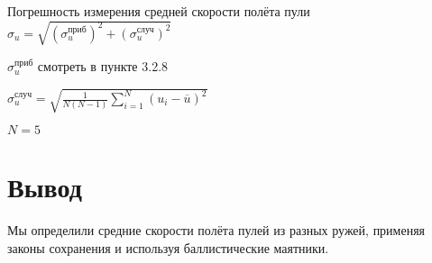 \documentclass[a4paper]{article}
\begin{document}
\item Погрешность измерения средней скорости полёта пули $\sigma_u = \sqrt{(\sigma_u^{\text{приб}})^2 + (\sigma_u^{\text{случ}})^2}$

\item $\sigma_u^{\text{приб}}$ смотреть в пункте 3.2.8

\item $\sigma_u^{\text{случ}} = \sqrt{\frac{1}{N(N-1)} \sum_{i = 1}^{N} (u_i - \overline{u})^2}$

\item $N = 5$

\section{Вывод}

Мы определили средние скорости полёта пулей из разных ружей, применяя законы сохранения и используя баллистические маятники.
\end{document}

